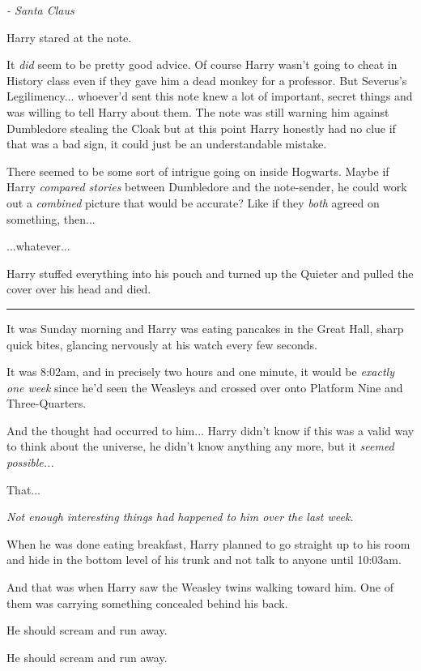 \emph{- Santa Claus}

Harry stared at the note.

It \emph{did} seem to be pretty good advice. Of course Harry wasn't
going to cheat in History class even if they gave him a dead monkey for
a professor. But Severus's Legilimency... whoever'd sent this note
knew a lot of important, secret things and was willing to tell Harry
about them. The note was still warning him against Dumbledore stealing
the Cloak but at this point Harry honestly had no clue if that was a bad
sign, it could just be an understandable mistake.

There seemed to be some sort of intrigue going on inside Hogwarts. Maybe
if Harry \emph{compared stories} between Dumbledore and the note-sender,
he could work out a \emph{combined} picture that would be accurate? Like
if they \emph{both} agreed on something, then...

...whatever...

Harry stuffed everything into his pouch and turned up the Quieter and
pulled the cover over his head and died.

\begin{center}\rule{3in}{0.4pt}\end{center}

It was Sunday morning and Harry was eating pancakes in the Great Hall,
sharp quick bites, glancing nervously at his watch every few seconds.

It was 8:02am, and in precisely two hours and one minute, it would be
\emph{exactly one week} since he'd seen the Weasleys and crossed over
onto Platform Nine and Three-Quarters.

And the thought had occurred to him... Harry didn't know if this
was a valid way to think about the universe, he didn't know anything any
more, but it \emph{seemed possible...}

That...

\emph{Not enough interesting things had happened to him over the last
week.}

When he was done eating breakfast, Harry planned to go straight up to
his room and hide in the bottom level of his trunk and not talk to
anyone until 10:03am.

And that was when Harry saw the Weasley twins walking toward him. One of
them was carrying something concealed behind his back.

He should scream and run away.

He should scream and run away.

